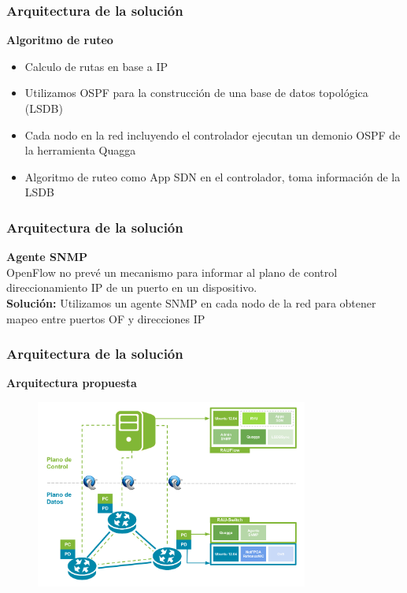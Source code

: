 \documentclass{beamer}
\begin{document}
\begin{frame}
\frametitle{Arquitectura de la soluci\'on} 

\textbf{Algoritmo de ruteo} \\
\begin{itemize}
\item Calculo de rutas en base a IP
\item Utilizamos OSPF para la construcci\'on de una base de datos topol\'ogica (LSDB)
\item Cada nodo en la red incluyendo el controlador ejecutan un demonio OSPF de la herramienta Quagga
\item Algoritmo de ruteo como App SDN en el controlador, toma informaci\'on de la LSDB
\end{itemize}

\end{frame}

\begin{frame}
\frametitle{Arquitectura de la soluci\'on} 

\textbf{Agente SNMP} \\
OpenFlow no prev\'e un mecanismo para informar al plano de control direccionamiento IP de un puerto en un dispositivo. \\

\vspace{0.5cm}
\textbf{Soluci\'on:}  Utilizamos un agente SNMP en cada nodo de la red para obtener mapeo entre puertos OF y direcciones IP

\end{frame}

\begin{frame}
\frametitle{Arquitectura de la soluci\'on} 

\textbf{Arquitectura propuesta} \\

\begin{figure}[H]
\centering
\includegraphics[width=0.80\textwidth]{imagenes/arquitecturapropuesta1.png}
\end{figure}

\end{frame}
\end{document}
